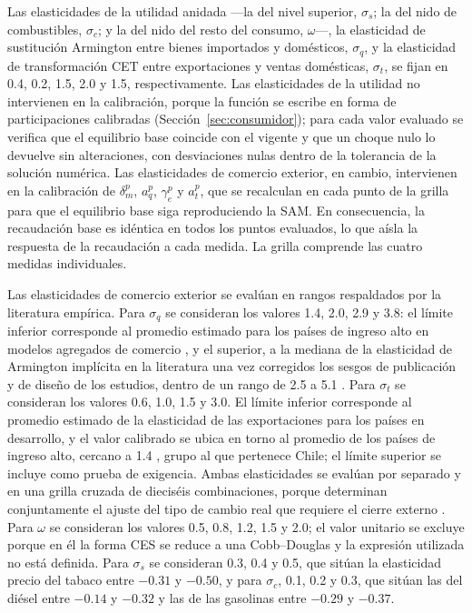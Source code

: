 \documentclass[11pt]{article}
\begin{document}
Las elasticidades de la utilidad anidada ---la del nivel superior, $\sigma_{s}$; la del nido de combustibles, $\sigma_{c}$; y la del nido del resto del consumo, $\omega$---, la elasticidad de sustitución Armington entre bienes importados y domésticos, $\sigma_{q}$, y la elasticidad de transformación CET entre exportaciones y ventas domésticas, $\sigma_{t}$, se fijan en 0.4, 0.2, 1.5, 2.0 y 1.5, respectivamente. Las elasticidades de la utilidad no intervienen en la calibración, porque la función se escribe en forma de participaciones calibradas (Sección~\ref{sec:consumidor}); para cada valor evaluado se verifica que el equilibrio base coincide con el vigente y que un choque nulo lo devuelve sin alteraciones, con desviaciones nulas dentro de la tolerancia de la solución numérica. Las elasticidades de comercio exterior, en cambio, intervienen en la calibración de $\delta_{m}^{p}$, $a_{q}^{p}$, $\gamma_{e}^{p}$ y $a_{t}^{p}$, que se recalculan en cada punto de la grilla para que el equilibrio base siga reproduciendo la SAM. En consecuencia, la recaudación base es idéntica en todos los puntos evaluados, lo que aísla la respuesta de la recaudación a cada medida. La grilla comprende las cuatro medidas individuales.

Las elasticidades de comercio exterior se evalúan en rangos respaldados por la literatura empírica. Para $\sigma_{q}$ se consideran los valores 1.4, 2.0, 2.9 y 3.8: el límite inferior corresponde al promedio estimado para los países de ingreso alto en modelos agregados de comercio \cite{devarajan_go_robinson_2023}, y el superior, a la mediana de la elasticidad de Armington implícita en la literatura una vez corregidos los sesgos de publicación y de diseño de los estudios, dentro de un rango de 2.5 a 5.1 \cite{bajzik_etal_2020}. Para $\sigma_{t}$ se consideran los valores 0.6, 1.0, 1.5 y 3.0. El límite inferior corresponde al promedio estimado de la elasticidad de las exportaciones para los países en desarrollo, y el valor calibrado se ubica en torno al promedio de los países de ingreso alto, cercano a 1.4 \cite{devarajan_go_robinson_2023}, grupo al que pertenece Chile; el límite superior se incluye como prueba de exigencia. Ambas elasticidades se evalúan por separado y en una grilla cruzada de dieciséis combinaciones, porque determinan conjuntamente el ajuste del tipo de cambio real que requiere el cierre externo \cite{demelo_robinson_1989}. Para $\omega$ se consideran los valores 0.5, 0.8, 1.2, 1.5 y 2.0; el valor unitario se excluye porque en él la forma CES se reduce a una Cobb--Douglas y la expresión utilizada no está definida. Para $\sigma_{s}$ se consideran 0.3, 0.4 y 0.5, que sitúan la elasticidad precio del tabaco entre $-0.31$ y $-0.50$, y para $\sigma_{c}$, 0.1, 0.2 y 0.3, que sitúan las del diésel entre $-0.14$ y $-0.32$ y las de las gasolinas entre $-0.29$ y $-0.37$.
\end{document}
